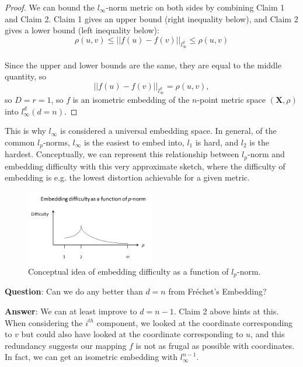 \begin{proof}
We can bound the $l_\infty$-norm metric
on both sides by combining Claim 1 and Claim 2. Claim 1 gives an 
upper bound (right inequality below), and Claim 2 gives a lower bound
(left inequality below):
\[
\rho (u,v) \leq ||f(u)-f(v)||_{l_\infty^d} \leq \rho (u,v)
\]\\
Since the upper and lower bounds are the same, they are equal 
to the middle quantity, so
\[
||f(u)-f(v)||_{l_\infty^d} = \rho (u,v),
\]
so $D=r=1$, so $f$ is an isometric embedding of the
$n$-point metric space $(\mathbf{X}, \rho)$ 
into $l_\infty^d (d=n)$.
\end{proof}

This is why $l_\infty$ is considered a universal embedding space. 
In general, of the common $l_p$-norms, 
$l_\infty$ is the easiest to embed into, $l_1$ is hard, and $l_2$
is the hardest. Conceptually, we can represent this
relationship between $l_p$-norm and embedding difficulty
with this very approximate sketch, where the 
difficulty of embedding is e.g. the lowest distortion 
achievable for a given metric.\\

\begin{figure}[h!]
\begin{center}
\includegraphics[width=0.5\textwidth]{chapter_5/files/embedding_difficulty.jpg}
\caption{Conceptual idea of embedding difficulty as
a function of $l_p$-norm.}
\end{center}
\end{figure}



\textbf{Question}: Can we do any better than
$d=n$ from Fr\'echet's Embedding?

\textbf{Answer}: We can at least improve to $d=n-1$. Claim 2 above 
hints at this.
When considering the $i^{th}$ component, we looked at 
the coordinate corresponding to $v$ but could also have looked at the
coordinate corresponding to $u$, and this redundancy suggests our mapping $f$
is not as frugal as possible with coordinates. In fact, we can get an
isometric embedding with $l_\infty^{n-1}$.\\

